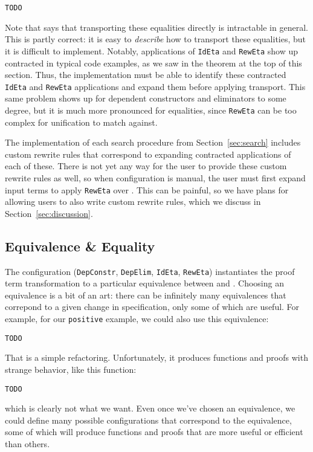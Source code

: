 \begin{lstlisting}
TODO
\end{lstlisting}

Note that \citet{tabareau2019marriage} says that transporting these equalities directly
is intractable in general.
This is partly correct: it is easy to \textit{describe} how to transport these equalities,
but it is difficult to implement.
Notably, applications of \lstinline{IdEta} and \lstinline{RewEta} show up contracted in typical code examples,
as we saw in the theorem at the top of this section.
Thus, the implementation must be able to identify these contracted \lstinline{IdEta} and \lstinline{RewEta}
applications and expand them before applying transport.
This same problem shows up for dependent constructors and eliminators to some degree,
but it is much more pronounced for equalities,
since \lstinline{RewEta} can be too complex for unification to match against.

The implementation of each search procedure from Section~\ref{sec:search} includes custom rewrite rules that correspond to expanding
contracted applications of each of these.
There is not yet any way for the user to provide these custom rewrite rules as well,
so when configuration is manual, the user must first expand input terms to apply \lstinline{RewEta} over \A.
This can be painful, so we have plans for allowing users to also write custom rewrite rules,
which we discuss in Section~\ref{sec:discussion}.

\subsection{Equivalence \& Equality}
\label{sec:art}

The configuration (\lstinline{DepConstr}, \lstinline{DepElim}, \lstinline{IdEta}, \lstinline{RewEta}) instantiates
the proof term transformation to a particular equivalence between \A and \B.
Choosing an equivalence is a bit of an art: there can be infinitely many equivalences that correpond to a 
given change in specification, only some of which are useful.
For example, for our \lstinline{positive} example, we could also use this equivalence:

\begin{lstlisting}
TODO
\end{lstlisting}
That is a simple refactoring. Unfortunately, it produces functions and proofs with strange behavior, like this function:

\begin{lstlisting}
TODO
\end{lstlisting}
which is clearly not what we want.
Even once we've chosen an equivalence, we could define many possible configurations that correspond
to the equivalence, some of which will produce functions and proofs that are more useful or efficient than others.


